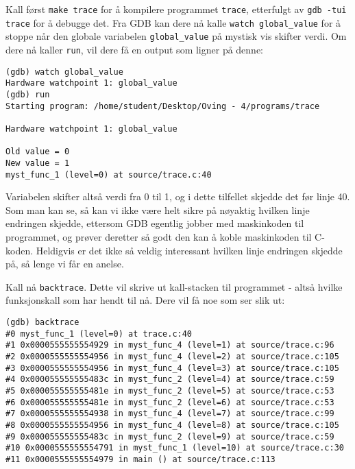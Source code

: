 Kall først \verb|make trace| for å kompilere programmet \verb|trace|, etterfulgt av \verb|gdb -tui| \verb|trace| for å debugge det. Fra GDB kan dere nå kalle \verb|watch global_value| for å stoppe når den globale variabelen \verb|global_value| på mystisk vis skifter verdi. Om dere nå kaller \verb|run|, vil dere få en output som ligner på denne:


\begin{lstlisting}[mathescape=true,keywordstyle=\color{black}]
(gdb) watch global_value
Hardware watchpoint 1: global_value
(gdb) run
Starting program: /home/student/Desktop/Oving - 4/programs/trace

Hardware watchpoint 1: global_value

Old value = 0
New value = 1
myst_func_1 (level=0) at source/trace.c:40

\end{lstlisting}


Variabelen skifter altså verdi fra 0 til 1, og i dette tilfellet skjedde det før linje 40. Som man kan se, så kan vi ikke være helt sikre på nøyaktig hvilken linje endringen skjedde, ettersom GDB egentlig jobber med maskinkoden til programmet, og prøver deretter så godt den kan å koble maskinkoden til C-koden. Heldigvis er det ikke så veldig interessant hvilken linje endringen skjedde på, så lenge vi får en anelse. 

Kall nå \verb|backtrace|. Dette vil skrive ut kall-stacken til programmet - altså hvilke funksjonskall som har hendt til nå. Dere vil få noe som ser slik ut:

\begin{lstlisting}[mathescape=true,keywordstyle=\color{black}]
(gdb) backtrace
#0 myst_func_1 (level=0) at trace.c:40
#1 0x0000555555554929 in myst_func_4 (level=1) at source/trace.c:96
#2 0x0000555555554956 in myst_func_4 (level=2) at source/trace.c:105
#3 0x0000555555554956 in myst_func_4 (level=3) at source/trace.c:105
#4 0x000055555555483c in myst_func_2 (level=4) at source/trace.c:59
#5 0x000055555555481e in myst_func_2 (level=5) at source/trace.c:53
#6 0x000055555555481e in myst_func_2 (level=6) at source/trace.c:53
#7 0x0000555555554938 in myst_func_4 (level=7) at source/trace.c:99
#8 0x0000555555554956 in myst_func_4 (level=8) at source/trace.c:105
#9 0x000055555555483c in myst_func_2 (level=9) at source/trace.c:59
#10 0x0000555555554791 in myst_func_1 (level=10) at source/trace.c:30
#11 0x0000555555554979 in main () at source/trace.c:113

\end{lstlisting}

